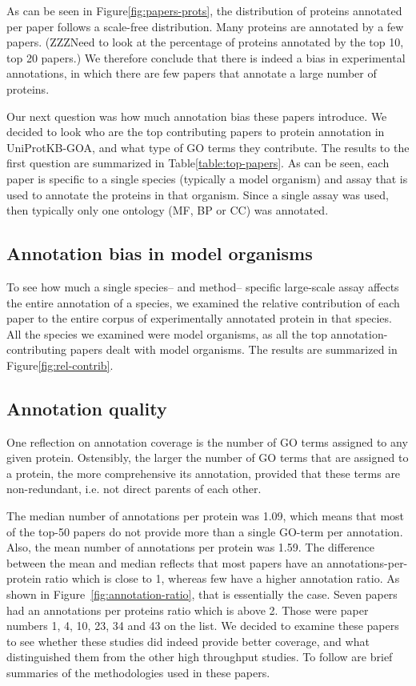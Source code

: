 \documentclass[10pt]{bmc_article}
\newenvironment{bmcformat}{\begin{raggedright}\baselineskip20pt\sloppy\setboolean{publ}{false}}{\end{raggedright}\baselineskip20pt\sloppy}
\begin{document}
\begin{bmcformat}
As can be seen in Figure\ref{fig:papers-prots}, the distribution of proteins
annotated per paper follows a scale-free distribution.  Many proteins are annotated by a
few papers. (ZZZNeed to look at the percentage of proteins annotated by the top
10, top 20 papers.) We therefore conclude that there is indeed a bias in
experimental annotations, in which there are few papers that annotate a large
number of proteins.

Our next question was how much annotation bias these papers introduce. We decided
to look who are the top contributing papers to protein annotation in
UniProtKB-GOA, and what type of GO terms they contribute.  The results to the
first question are summarized in Table\ref{table:top-papers}.  As can be seen,
each paper is specific to a single species (typically a model
organism) and assay that is used to annotate the proteins in that organism. Since
a single assay was used, then typically only one ontology (MF, BP or CC) was
annotated. 
 
\subsection*{Annotation bias in model organisms}

To see how much a single species-- and method-- specific large-scale assay affects
the entire annotation of a species, we examined the relative contribution of each
paper to the entire corpus of experimentally annotated protein in that species.  All
the species we examined were model organisms, as all the top annotation-contributing
papers dealt with model organisms.  The results are summarized in
Figure\ref{fig:rel-contrib}.

\subsection*{Annotation quality}

One reflection on annotation coverage is the number of GO terms assigned to any
given protein. Ostensibly, the larger the number of GO terms that are assigned to a
protein, the more comprehensive its annotation, provided that these terms are
non-redundant, i.e. not direct parents of each other. 

The median number of annotations per protein was 1.09, which means that most of the top-50
papers do not provide more than a single GO-term per annotation. Also, the mean number of
annotations per protein was 1.59. The difference between the mean and median reflects that
most papers have an annotations-per-protein ratio which is close to 1, whereas few have a
higher annotation ratio. As shown in Figure~\ref{fig:annotation-ratio}, that is essentially
the case. Seven papers had an annotations per proteins ratio which is above 2. Those
were paper numbers 1, 4, 10, 23, 34 and 43 on the list. We decided to examine these papers
to see whether these studies did indeed provide better coverage, and what distinguished them
from the other high throughput studies. To follow are brief summaries of the
methodologies used in these papers.


\end{bmcformat}
\end{document}
